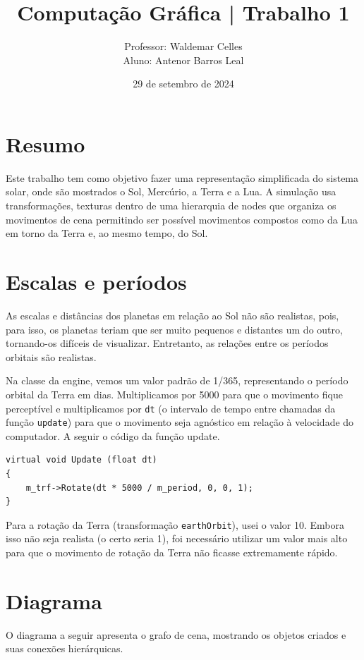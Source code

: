 \documentclass[11pt, a4paper]{article}
\title{Computação Gráfica | Trabalho 1}
\author{Professor: Waldemar Celles\\
Aluno: Antenor Barros Leal}
\date{29 de setembro de 2024}
\begin{document}
\maketitle

\section {Resumo}
Este trabalho tem como objetivo fazer uma representação simplificada do sistema 
solar, onde são mostrados o Sol, Mercúrio, a Terra e a Lua. A simulação 
usa transformações, texturas dentro de uma hierarquia de nodes que organiza os
movimentos de cena permitindo ser possível movimentos compostos como da Lua em
torno da Terra e, ao mesmo tempo, do Sol.

\section {Escalas e períodos}

As escalas e distâncias dos planetas em relação ao Sol não são realistas, pois, 
para isso, os planetas teriam que ser muito pequenos e distantes um do outro, 
tornando-os difíceis de visualizar. Entretanto, as relações entre os períodos 
orbitais são realistas.

Na classe da engine, vemos um valor padrão de 1/365, representando o período 
orbital da Terra em dias. Multiplicamos por 5000 para que o movimento fique 
perceptível e multiplicamos por \texttt{dt} (o intervalo de tempo entre 
chamadas da função \texttt{update}) para que o movimento seja agnóstico em 
relação à velocidade do computador. A seguir o código da função update.

\begin{verbatim}
virtual void Update (float dt)
{
    m_trf->Rotate(dt * 5000 / m_period, 0, 0, 1);
}
\end{verbatim}

Para a rotação da Terra (transformação \texttt{earthOrbit}), usei o valor 10. 
Embora isso não seja realista (o certo seria 1), foi necessário utilizar um 
valor mais alto para que o movimento de rotação da Terra não ficasse extremamente 
rápido.

\section {Diagrama}

O diagrama a seguir apresenta o grafo de cena, mostrando os objetos criados e 
suas conexões hierárquicas.
\end{document}
